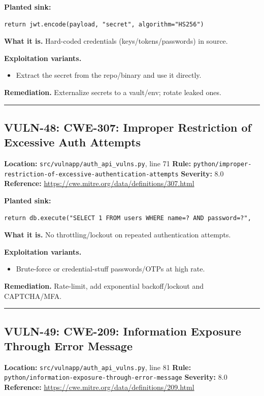\documentclass[11pt,a4paper]{article}
\begin{document}
\noindent\textbf{Planted sink:}
\begin{lstlisting}
return jwt.encode(payload, "secret", algorithm="HS256")
\end{lstlisting}
\noindent\textbf{What it is.} Hard-coded credentials (keys/tokens/passwords) in source.

\noindent\textbf{Exploitation variants.}
\begin{itemize}[leftmargin=1.4em,itemsep=1pt,topsep=2pt]
\item Extract the secret from the repo/binary and use it directly.
\end{itemize}
\noindent\textbf{Remediation.} Externalize secrets to a vault/env; rotate leaked ones.

\vspace{4pt}\hrule\vspace{6pt}
\subsection{VULN-48: CWE-307: Improper Restriction of Excessive Auth Attempts}
\noindent\textbf{Location:} \texttt{src/vulnapp/auth\_api\_vulns.py}, line 71 \quad \textbf{Rule:} \texttt{python/improper-restriction-of-excessive-authentication-attempts} \quad \textbf{Severity:} 8.0
\\ \textbf{Reference:} \url{https://cwe.mitre.org/data/definitions/307.html}

\noindent\textbf{Planted sink:}
\begin{lstlisting}
return db.execute("SELECT 1 FROM users WHERE name=? AND password=?",
\end{lstlisting}
\noindent\textbf{What it is.} No throttling/lockout on repeated authentication attempts.

\noindent\textbf{Exploitation variants.}
\begin{itemize}[leftmargin=1.4em,itemsep=1pt,topsep=2pt]
\item Brute-force or credential-stuff passwords/OTPs at high rate.
\end{itemize}
\noindent\textbf{Remediation.} Rate-limit, add exponential backoff/lockout and CAPTCHA/MFA.

\vspace{4pt}\hrule\vspace{6pt}
\subsection{VULN-49: CWE-209: Information Exposure Through Error Message}
\noindent\textbf{Location:} \texttt{src/vulnapp/auth\_api\_vulns.py}, line 81 \quad \textbf{Rule:} \texttt{python/information-exposure-through-error-message} \quad \textbf{Severity:} 8.0
\\ \textbf{Reference:} \url{https://cwe.mitre.org/data/definitions/209.html}
\end{document}
